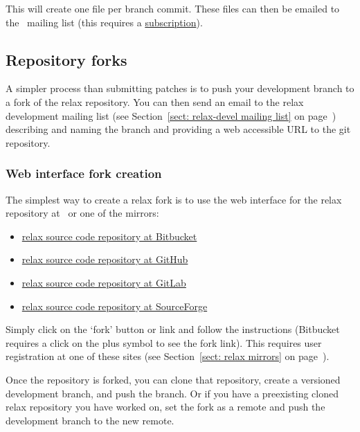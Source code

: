 
This will create one  file per branch commit.
These files can then be emailed to the \relaxDevelML\ mailing list (this requires a \href{\relaxDevelMLSubscribeURL}{subscription}).


\subsection{Repository forks}

A simpler process than submitting patches is to push your development branch to a fork of the relax repository.
You can then send an email to the relax development mailing list (see Section~\ref{sect: relax-devel mailing list} on page~\pageref{sect: relax-devel mailing list}) describing and naming the branch and providing a web accessible URL to the git repository.


\subsubsection{Web interface fork creation}

The simplest way to create a relax fork is to use the web interface for the relax repository at \relaxHome\ or one of the mirrors:
\begin{itemize}
    \item \href{\relaxMirrorBBCodeWebInterfaceURL}{relax source code repository at Bitbucket}
    \item \href{\relaxMirrorGHCodeWebInterfaceURL}{relax source code repository at GitHub}
    \item \href{\relaxMirrorGLCodeWebInterfaceURL}{relax source code repository at GitLab}
    \item \href{\relaxMirrorSFCodeWebInterfaceURL}{relax source code repository at SourceForge}
\end{itemize}

Simply click on the `fork' button or link and follow the instructions (Bitbucket requires a click on the plus symbol to see the fork link).
This requires user registration at one of these sites (see Section~\ref{sect: relax mirrors} on page~\pageref{sect: relax mirrors}).

Once the repository is forked, you can clone that repository, create a versioned development branch, and push the branch.
Or if you have a preexisting cloned relax repository you have worked on, set the fork as a remote and push the development branch to the new remote.


